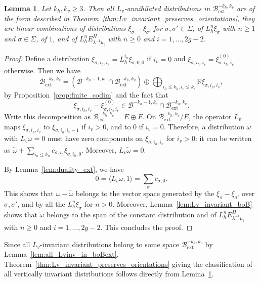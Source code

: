 \documentclass[10pt]{amsart}
\newcommand{\ext}{\mathrm{ext}}
\newcommand{\boB}{\mathcal{B}}
\newcommand{\R}{\mathbb{R}}
\newtheorem{lem}[thm]{Lemma}
\theoremstyle{definition}
\numberwithin{equation}{section}
\begin{document}
\begin{lem}
\label{lem:Lvinv_description} Let $k_h, k_v \geq 3$. Then all
$L_v$-annihilated distributions in $\boB^{-k_h, k_v}_{\ext}$ are of the form
described in Theorem~\ref{thm:Lv_invariant_preserves_orientations}, \ie they are linear combinations of distributions $\xi_\sigma - \xi_{\sigma'}$
for $\sigma,\sigma'\in \Sigma$, of $L_h^n \xi_\sigma$ with $n\geq 1$ and
$\sigma\in \Sigma$, of $1$, and of $L_h^n E^H_{\lambda^{-1}\mu_i}$ with
$n\geq 0$ and $i=1,\dotsc, 2g-2$.
\end{lem}
\begin{proof}
Define a distribution $\xi_{\sigma, i_h, i_v} = L_h^{i_h} \xi_{\sigma, 0, 0}$
if $i_v = 0$ and $\xi_{\sigma, i_h, i_v} = \xi^{(0)}_{\sigma, i_h, i_v}$
otherwise. Then we have
\begin{equation*}
\boB^{-k_h, k_v}_{\ext} = (\boB^{-k_h-1, k_v} \cap \boB^{-k_h, k_v}_{\ext}) \oplus \bigoplus_{i_h \leq k_h, i_v\leq k_v} \R \xi_{\sigma, i_h, i_v},
\end{equation*}
by Proposition~\ref{prop:finite_codim} and the fact that
\[
\xi_{\sigma, i_h,
i_v} - \xi^{(0)}_{\sigma, i_h, i_v} \in \boB^{-k_h-1, k_v} \cap \boB^{-k_h,
k_v}_{\ext}.
\]
Write this decomposition as $\boB^{-k_h, k_v}_{\ext} = E \oplus
F$. On $\boB^{-k_h, k_v}_{\ext} / E$, the operator $L_v$ maps $\xi_{\sigma,
i_h, i_v}$ to $\xi_{\sigma, i_h, i_v-1}$ if $i_v > 0$, and to $0$ if $i_v=0$.
Therefore, a distribution $\omega$ with $L_v \omega = 0$ must have zero
components on $\xi_{\sigma, i_h, i_v}$ for $i_v>0$: it can be written as
$\tilde \omega + \sum_{i_h \leq k_h} c_{\sigma, i_h} \xi_{\sigma, i_h, 0}$.
Moreover, $L_v \tilde \omega = 0$.

By Lemma~\ref{lem:duality_ext}, we have
\begin{equation*}
0 = \langle L_v \omega, 1 \rangle = \sum_{\sigma} c_{\sigma, 0}.
\end{equation*}
This shows that $\omega -\tilde \omega$ belongs to the vector space generated
by the $\xi_\sigma-\xi_{\sigma'}$ over $\sigma, \sigma'$, and by all the
$L_h^n \xi_\sigma$ for $n>0$. Moreover, Lemma~\ref{lem:Lv_invariant_boB}
shows that $\tilde\omega$ belongs to the span of the constant distribution
and of $L_h^n E^H_{\lambda^{-1}\mu_i}$ with $n\geq 0$ and $i=1,\dotsc, 2g-2$.
This concludes the proof.
\end{proof}

Since all $L_v$-invariant distributions belong to some space $\boB^{-k_h,
k_v}_{\ext}$ by Lemma~\ref{lem:all_Lvinv_in_boBext},
Theorem~\ref{thm:Lv_invariant_preserves_orientations} giving the
classification of all vertically invariant distributions follows directly
from Lemma~\ref{lem:Lvinv_description}.
\end{document}
